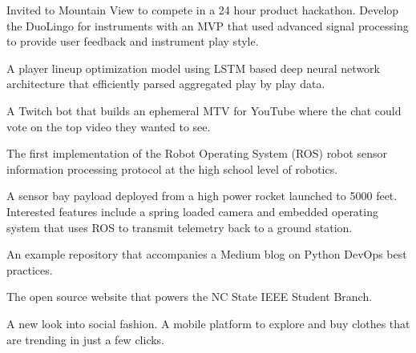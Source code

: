 {%
	Invited to Mountain View to compete in a 24 hour product hackathon. Develop the DuoLingo for instruments with an MVP that used advanced signal processing to provide user feedback and instrument play style.
}

\vspace{0.5em}

{%
	A player lineup optimization model using LSTM based deep neural network architecture that efficiently parsed aggregated play by play data.
}

\vspace{0.5em}

{%
	A Twitch bot that builds an ephemeral MTV for YouTube where the chat could vote on the top video they wanted to see.
}

\vspace{0.5em}

{%
	The first implementation of the Robot Operating System (ROS) robot sensor information processing protocol at the high school level of robotics.
}

\vspace{0.5em}

{%
	A sensor bay payload deployed from a high power rocket launched to 5000 feet. Interested features include a spring loaded camera and embedded operating system that uses ROS to transmit telemetry back to a ground station.
}

\vspace{0.5em}

{%
	An example repository that accompanies a Medium blog on Python DevOps best practices.
}

\vspace{0.5em}

{%
	The open source website that powers the NC State IEEE Student Branch.
}

\vspace{0.5em}

{%
	A new look into social fashion. A mobile platform to explore and buy clothes that are trending in just a few clicks.
}
